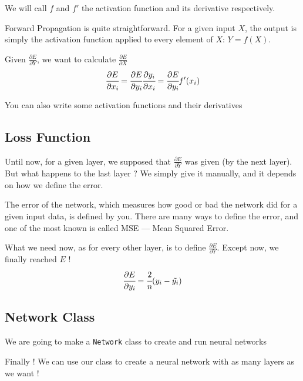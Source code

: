 We will call $f$ and $f'$ the activation function and its derivative respectively.

Forward Propagation is quite straightforward. For a given input $X$, the output is simply the activation function applied to every element of $X$: $Y = f(X)$. 

Given $\frac{\partial E}{\partial Y}$, we want to calculate $\frac{\partial E}{\partial X}$
\begin{equation}
\cfrac{\partial E}{\partial x_i} = \cfrac{\partial E}{\partial y_i}\cfrac{\partial y_i}{\partial x_i} = \cfrac{\partial E}{\partial y_i} f'(x_i) 
\end{equation}


You can also write some activation functions and their derivatives


\subsection{Loss Function}
Until now, for a given layer, we supposed that $\frac{\partial E}{\partial Y}$ was given (by the next layer). But what happens to the last layer ? We simply give it manually, and it depends on how we define the error.

The error of the network, which measures how good or bad the network did for a given input data, is defined by you. There are many ways to define the error, and one of the most known is called MSE — Mean Squared Error.

What we need now, as for every other layer, is to define $\frac{\partial E}{\partial Y}$. Except now, we finally reached $E$ !
\begin{equation}
\cfrac{\partial E}{\partial y_i} = \cfrac{2}{n} (y_i - \tilde{y_i}) 
\end{equation}


\subsection{Network Class}

We are going to make a \texttt{Network} class to create and run neural networks


Finally ! We can use our class to create a neural network with as many layers as we want !

